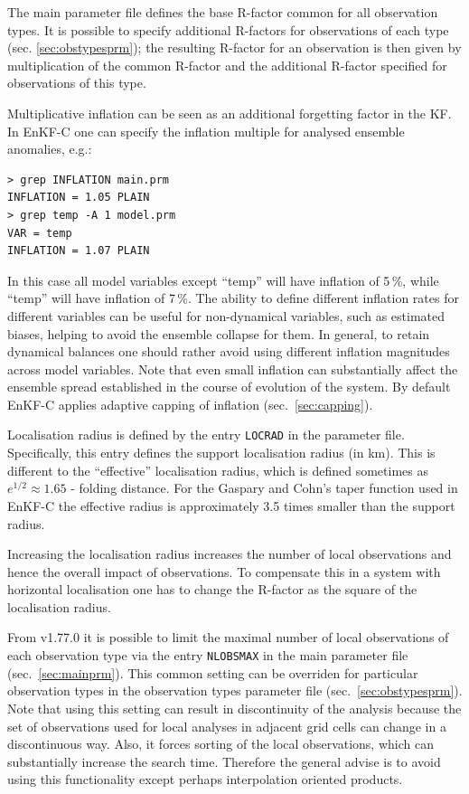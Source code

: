 \documentclass[11pt]{report}
\begin{document}
The main parameter file defines the base R-factor common for all observation types.
It is possible to specify additional R-factors for observations of each type (sec. \ref{sec:obstypesprm}); the resulting R-factor for an observation is then given by multiplication of the common R-factor and the additional R-factor specified for observations of this type.

Multiplicative inflation can be seen as an additional forgetting factor in the KF.
In EnKF-C one can specify the inflation multiple for analysed ensemble anomalies, e.g.:
\begin{Verbatim}[frame=single,fontsize=\footnotesize]
> grep INFLATION main.prm
INFLATION = 1.05 PLAIN
> grep temp -A 1 model.prm
VAR = temp
INFLATION = 1.07 PLAIN
\end{Verbatim}
In this case all model variables except ``temp'' will have inflation of 5\,\%, while ``temp'' will have inflation of 7\,\%.
The ability to define different inflation rates for different variables can be useful for non-dynamical variables, such as estimated biases, helping to avoid the ensemble collapse for them.
In general, to retain dynamical balances one should rather avoid using different inflation magnitudes across model variables.
Note that even small inflation can substantially affect the ensemble spread established in the course of evolution of the system.
By default EnKF-C applies adaptive capping of inflation (sec.~\ref{sec:capping}).

Localisation radius is defined by the entry \verb|LOCRAD| in the parameter file.
Specifically, this entry defines the support localisation radius (in km).
This is different to the ``effective'' localisation radius, which is defined sometimes as $e^{1/2}\approx 1.65$ - folding distance.
For the Gaspary and Cohn's taper function used in EnKF-C the effective radius is approximately 3.5 times smaller than the support radius.

Increasing the localisation radius increases the number of local observations and hence the overall impact of observations.
To compensate this in a system with horizontal localisation one has to change the R-factor as the square of the localisation radius.

From v1.77.0 it is possible to limit the maximal number of local observations of each observation type via the entry \verb|NLOBSMAX| in the main parameter file (sec.~\ref{sec:mainprm}).
This common setting can be overriden for particular observation types in the observation types parameter file (sec.~\ref{sec:obstypesprm}).
Note that using this setting can result in discontinuity of the analysis because the set of observations used for local analyses in adjacent grid cells can change in a discontinuous way.
Also, it forces sorting of the local observations, which can substantially increase the search time.
Therefore the general advise is to avoid using this functionality except perhaps interpolation oriented products.
\end{document}
